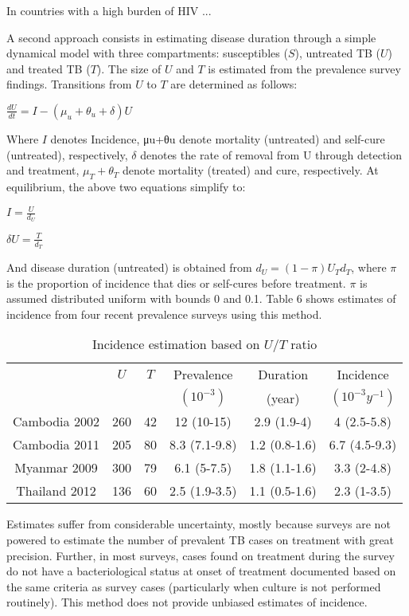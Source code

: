 In countries with a high burden of HIV ...


A second approach consists in estimating disease duration through a simple dynamical model with three compartments: susceptibles ($S$), untreated TB ($U$) and treated TB ($T$). The size of $U$ and $T$ is estimated from the prevalence survey findings. Transitions from $U$ to $T$ are determined as follows:

$\frac{dU}{dt} = I - (\mu_u + \theta_u + \delta)U$

Where $I$ denotes Incidence, μu+θu denote mortality (untreated) and self-cure (untreated), respectively, $\delta$ denotes the rate of removal from U through detection and treatment, $\mu_T + \theta_T$ denote mortality (treated) and cure, respectively. At equilibrium, the above two equations simplify to: 

$I = \frac{U}{d_U}$

$\delta U = \frac{T}{d_T}$

And disease duration (untreated) is obtained from $d_U=(1-\pi)U_T d_T$, where $\pi$ is the proportion of incidence that dies or self-cures before treatment. $\pi$ is assumed distributed uniform with bounds 0 and 0.1. Table 6 shows estimates of incidence from four recent prevalence surveys using this method. 

\begin{table} 
    \begin{tabular}{ c c c c c c }
    \hline
         & $U$ & $T$ & Prevalence & Duration & Incidence \\ 
         &     &     & $(10^{-3})$ & (year)    & $(10^{-3}y^{-1})$ \\
     \hline
        Cambodia 2002 & 260 & 42 & 12 (10-15) & 2.9 (1.9-4) & 4 (2.5-5.8) \\ 
        Cambodia 2011 & 205 & 80 & 8.3 (7.1-9.8) & 1.2 (0.8-1.6) & 6.7 (4.5-9.3) \\ 
        Myanmar 2009 & 300 & 79 & 6.1 (5-7.5) & 1.8 (1.1-1.6) & 3.3 (2-4.8) \\ 
        Thailand 2012 & 136 & 60 & 2.5 (1.9-3.5) & 1.1 (0.5-1.6) & 2.3 (1-3.5) \\ 
    \hline
    \end{tabular} 
    \caption{Incidence estimation based on $U/T$ ratio
} 
\end{table}

Estimates suffer from considerable uncertainty, mostly because surveys are not powered to estimate the number of prevalent TB cases on treatment with great precision. Further, in most surveys, cases found on treatment during the survey do not have a bacteriological status at onset of treatment documented based on the same criteria as survey cases (particularly when culture is not performed routinely). This method does not provide unbiased estimates of incidence.

